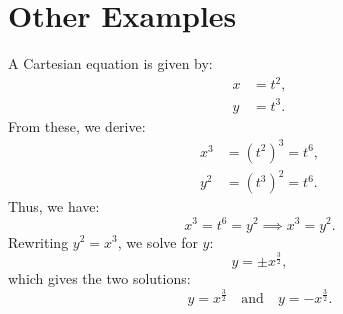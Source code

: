 \documentclass{article}
\begin{document}
\section*{Other Examples}

\begin{tcolorbox}[colframe=RoyalPurple, colback=purple!5!white, title=Advanced Example]
A Cartesian equation is given by:
\[ \begin{aligned}
    x &= t^2, \\
    y &= t^3.
\end{aligned} \]
From these, we derive:
\[ \begin{aligned}
    x^3 &= (t^2)^3 = t^6, \\
    y^2 &= (t^3)^2 = t^6.
\end{aligned} \]
Thus, we have:
\[ x^3 = t^6 = y^2 \implies x^3 = y^2. \]
Rewriting $y^2 = x^3$, we solve for $y$:
\[ y = \pm x^{\frac{3}{2}}, \]
which gives the two solutions:
\[ y = x^{\frac{3}{2}} \quad \text{and} \quad y = -x^{\frac{3}{2}}. \]
\end{tcolorbox}
\end{document}
